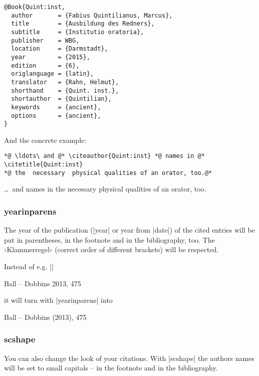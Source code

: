 \documentclass[a4paper,
10pt,
greek,
french,
spanish,
italian,
ngerman,
english
]{ltxdoc}
\begin{document}
\begin{lstlisting}[style=bibentry,label=Quint:inst,caption={{@}Book\{Quint:inst,…\} }]
@Book{Quint:inst,
  author       = {Fabius Quintilianus, Marcus},
  title        = {Ausbildung des Redners},
  subtitle     = {Institutio oratoria},
  publisher    = WBG,
  location     = {Darmstadt},
  year         = {2015},
  edition      = {6},
  origlanguage = {latin},
  translator   = {Rahn, Helmut},
  shorthand    = {Quint. inst.},
  shortauthor  = {Quintilian},
  keywords     = {ancient},
  options      = {ancient},
}
\end{lstlisting}

And the concrete example:
\begin{refsection}
\begin{lstlisting}
*@ \ldots\ and @* \citeauthor{Quint:inst} *@ names in @* \citetitle{Quint:inst} 
*@ the  necessary  physical qualities of an orator, too.@* \end{lstlisting}
 
\begin{bsp}
\ldots\ and \citeauthor{Quint:inst} names in  the  necessary  physical qualities of an orator, too.
\end{bsp}
\end{refsection}



\subsubsection{yearinparens}\label{yearinparens}
%
The year of the publication (|year| or year from |date|) of the cited entries will be put in parentheses,
in the footnote and in the bibliography, too. 
The ›Klammerregel‹ (correct order of different brackets) will be respected.

Instead of e.g. |\cite[475]{Ball2013}|
\begin{bsp} Ball – Dobbins 2013, 475 \end{bsp}
 it will turn with |yearinparens| into
\begin{bsp}
Ball – Dobbins {\color{red}(}2013{\color{red})}, 475
\end{bsp}




\subsubsection{scshape}\label{scshape}
You can also change the look of your citations. With |scshape| the authors names will be set to small capitals -- in the footnote and in the bibliography.
\end{document}
